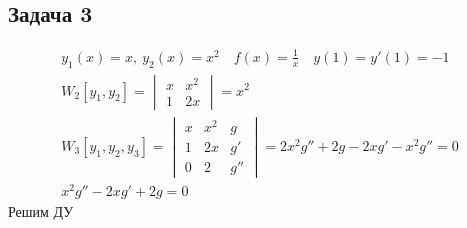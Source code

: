 \subsection*{Задача 3}
	\begin{gather*}
		y_1(x) = x,\ y_2(x) = x^2\quad f(x) = \frac{1}{x}\quad y(1) = y'(1) = -1\\
		W_2[y_1,y_2] = 
		\begin{vmatrix}
			x & x^2\\
			1 & 2x
		\end{vmatrix}
		= x^2\\
		W_3[y_1,y_2,y_3] =
		\begin{vmatrix}
			x & x^2 & g\\
			1 & 2x & g'\\
			0 & 2 & g''
		\end{vmatrix}
		=
		2x^2 g'' + 2g  - 2xg' - x^2 g'' = 0\\
		x^2g'' - 2xg' + 2g = 0
	\end{gather*}
	Решим ДУ
